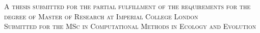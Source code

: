 \begin{titlepage}



\textsc{A thesis submitted for the partial fulfillment of the requirements for the degree of Master of Research at Imperial College London}\\[0.5cm]

\textsc{Submitted for the MSc in Computational Methods in Ecology and Evolution}\\[0.5cm]


\vfill %

\end{titlepage}
